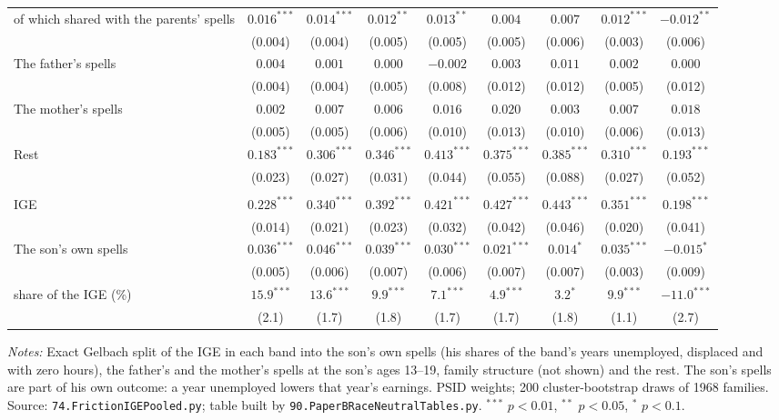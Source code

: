 \begin{table}[!htbp]
{{\begin{tabular}{lcccccccc}
\quad of which shared with the parents' spells & $0.016^{***}$ & $0.014^{***}$ & $0.012^{**}$ & $0.013^{**}$ & $0.004$ & $0.007$ & $0.012^{***}$ & $-0.012^{**}$ \\
 & (0.004) & (0.004) & (0.005) & (0.005) & (0.005) & (0.006) & (0.003) & (0.006) \\
The father's spells & $0.004$ & $0.001$ & $0.000$ & $-0.002$ & $0.003$ & $0.011$ & $0.002$ & $0.000$ \\
 & (0.004) & (0.004) & (0.005) & (0.008) & (0.012) & (0.012) & (0.005) & (0.012) \\
The mother's spells & $0.002$ & $0.007$ & $0.006$ & $0.016$ & $0.020$ & $0.003$ & $0.007$ & $0.018$ \\
 & (0.005) & (0.005) & (0.006) & (0.010) & (0.013) & (0.010) & (0.006) & (0.013) \\
Rest & $0.183^{***}$ & $0.306^{***}$ & $0.346^{***}$ & $0.413^{***}$ & $0.375^{***}$ & $0.385^{***}$ & $0.310^{***}$ & $0.193^{***}$ \\
 & (0.023) & (0.027) & (0.031) & (0.044) & (0.055) & (0.088) & (0.027) & (0.052) \\
\addlinespace
\multicolumn{9}{l}{\textit{B. Sons' ln hourly wage}} \\
IGE & $0.228^{***}$ & $0.340^{***}$ & $0.392^{***}$ & $0.421^{***}$ & $0.427^{***}$ & $0.443^{***}$ & $0.351^{***}$ & $0.198^{***}$ \\
 & (0.014) & (0.021) & (0.023) & (0.032) & (0.042) & (0.046) & (0.020) & (0.041) \\
The son's own spells & $0.036^{***}$ & $0.046^{***}$ & $0.039^{***}$ & $0.030^{***}$ & $0.021^{***}$ & $0.014^{*}$ & $0.035^{***}$ & $-0.015^{*}$ \\
 & (0.005) & (0.006) & (0.007) & (0.006) & (0.007) & (0.007) & (0.003) & (0.009) \\
\quad share of the IGE (\%) & $15.9^{***}$ & $13.6^{***}$ & $9.9^{***}$ & $7.1^{***}$ & $4.9^{***}$ & $3.2^{*}$ & $9.9^{***}$ & $-11.0^{***}$ \\
 & (2.1) & (1.7) & (1.8) & (1.7) & (1.7) & (1.8) & (1.1) & (2.7) \\
\bottomrule
\end{tabular}}}
\par\smallskip
\begin{minipage}{\textwidth}\footnotesize \textit{Notes:} Exact Gelbach split of the IGE in each band into the son's own spells (his shares of the band's years unemployed, displaced and with zero hours), the father's and the mother's spells at the son's ages 13--19, family structure (not shown) and the rest. The son's spells are part of his own outcome: a year unemployed lowers that year's earnings. PSID weights; 200 cluster-bootstrap draws of 1968 families. Source: \texttt{74.FrictionIGEPooled.py}; table built by \texttt{90.PaperBRaceNeutralTables.py}. $^{***}$ $p<0.01$, $^{**}$ $p<0.05$, $^{*}$ $p<0.1$.\end{minipage}
\end{table}
